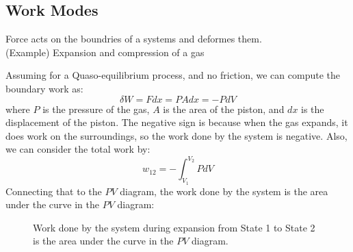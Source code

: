 \documentclass[11pt]{report}
\begin{document}
\subsection{Work Modes}
\begin{definition}
    Force acts on the boundries of a systems and deformes them. \\
    (Example) Expansion and compression of a gas 

    Assuming for a Quaso-equilibrium process, and no friction, we can compute the boundary work as:
    \begin{equation}
        \delta W = F dx  = P A dx = - P dV
    \end{equation}
    where $P$ is the pressure of the gas, $A$ is the area of the piston, and $dx$ is the displacement of the piston. The negative sign is because when the gas expands, it does work on the surroundings, so the work done by the system is negative. Also, we can consider the total work by:
    \begin{equation}
        w_{12} = -\int_{V_1}^{V_2} P dV
    \end{equation}
     Connecting that to the $PV$ diagram, the work done by the system is the area under the curve in the $PV$ diagram:

\begin{figure}[h!]
    \centering
    \caption{Work done by the system during expansion from State 1 to State 2 is the area under the curve in the $PV$ diagram.}
\end{figure}

\end{definition}
\newpage
\end{document}
